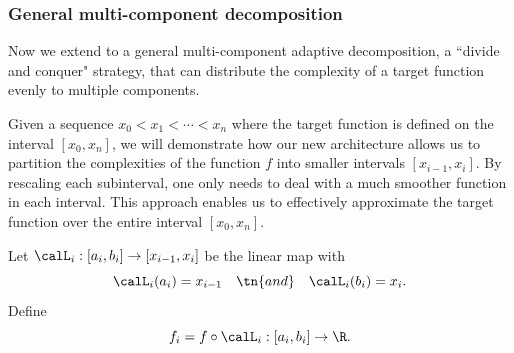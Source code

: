 \documentclass[review,hidelinks,onefignum,onetabnum]{siamart250211}
\begin{document}


\subsubsection{General multi-component decomposition}
\label{sec:1D:general:multi:component:decom}

Now we extend to a general multi-component adaptive decomposition, a ``divide and conquer" strategy, that can distribute the complexity of a target function evenly to multiple components. 


Given a sequence $x_0<x_1<\cdots<x_n$ where the target function is defined on the interval $[x_0,x_n]$, we will demonstrate how our new architecture allows us to partition the complexities of the function $f$ into smaller intervals $[x_{i-1},x_i]$. By rescaling each subinterval, one only needs to deal with a much smoother function in each interval. This approach enables us to effectively approximate the target function over the entire interval $[x_0,x_n]$. %



Let $\calL_i:[a_i,b_i]\to [x_{i-1},x_i]$ be the linear map with 
\begin{equation}\label{eq:1D:Li}
    \calL_i(a_i)=x_{i-1} \quad \tn{and}\quad \calL_i(b_i)=x_i.
\end{equation}
Define
\begin{equation}\label{eq:1D:fi}
    f_i=f\circ \calL_i: [a_i,b_i]\to \R. 
\end{equation}
\end{document}
